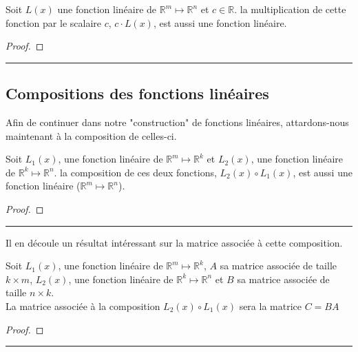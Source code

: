 \documentclass[12pt]{report}
\let\Bbb\mathbb
\theoremstyle{definition}
\newenvironment{preuve}{\renewcommand{\proofname}{Preuve}\begin{proof}}{\end{proof}\noindent\textcolor[RGB]{220,220,220}{\rule{\textwidth}{1pt}}}
\begin{document}
    \begin{prop}
        \label{thm:multiplication_scalaire}
        Soit $L(x)$ une fonction linéaire de $\Bbb R^m \mapsto \Bbb R^n$  et $c \in \Bbb R$.
        la multiplication de cette fonction par le scalaire $c$, $c \cdot L(x)$, est aussi une fonction linéaire.
    \end{prop}
    \begin{preuve}
    \end{preuve}

    \subsection{Compositions des fonctions linéaires}
    Afin de continuer dans notre "construction" de fonctions linéaires, attardons-nous
    maintenant à la composition de celles-ci.
    \begin{prop}
        \label{thm:composition_fonction_lineaire}
        Soit $L_1(x)$, une fonction linéaire de $\Bbb R^m \mapsto \Bbb R^k$ et $L_2(x)$, une fonction linéaire de $\Bbb R^k \mapsto \Bbb R^n$.
        la composition de ces deux fonctions, $L_2(x) \circ L_1(x)$, est aussi une fonction linéaire ($\Bbb R^m \mapsto \Bbb R^n$).
    \end{prop}
    \begin{preuve}
    \end{preuve}
    Il en découle un résultat intéressant sur la matrice associée à cette composition.
    \begin{prop}
        \label{thm:composition_matrices_associes}
        Soit $L_1(x)$, une fonction linéaire de $\Bbb R^m \mapsto \Bbb R^k$, $A$ sa matrice associée de taille $k \times m$,
         $L_2(x)$, une fonction linéaire de $\Bbb R^k \mapsto \Bbb R^n$ et $B$ sa matrice associée de taille $n \times k$.
         \\
         La matrice associée à la composition $L_2(x) \circ L_1(x)$ sera la matrice $C = BA$
    \end{prop}
    \begin{preuve}
    \end{preuve}
\end{document}
